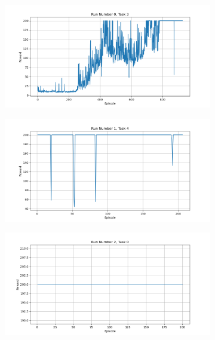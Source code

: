 \documentclass[runningheads]{llncs}
\begin{document}
\begin{figure}[H]
 \centering
 \begin{subfigure}{.45\textwidth}
     \centering
     \includegraphics[width=1\textwidth] {imgs/1000_episodes/Task_3_run_0}
 \end{subfigure}%
 \begin{subfigure}{.45\textwidth}
     \centering
     \includegraphics[width=1\textwidth] {imgs/1000_episodes/Task_4_run_1}
 \end{subfigure}
  \begin{subfigure}{.45\textwidth}
      \centering
      \includegraphics[width=1\textwidth] {imgs/1000_episodes/Task_0_run_2}

\end{subfigure}
\end{figure}
\end{document}
